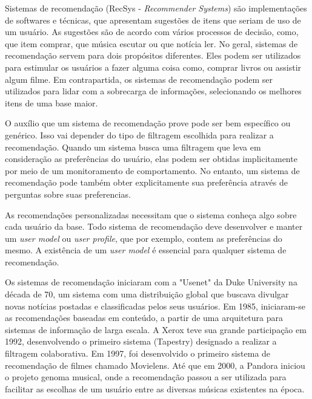 \documentclass{article}
\begin{document}
Sistemas de recomendação (RecSys{\color{red} - \textit{Recommender Systems}}) são implementações de softwares e técnicas, que apresentam sugestões de itens que seriam de uso de um usuário. As sugestões são de acordo com vários processos de decisão, como, que item comprar, que música escutar ou que notícia ler. No geral, sistemas de recomendação servem para dois propósitos diferentes. Eles podem ser utilizados para estimular os usuários a fazer alguma coisa como, comprar livros ou assistir algum filme. Em contrapartida, os sistemas de recomendação podem ser utilizados para lidar com a sobrecarga de informações, selecionando os melhores itens de uma base maior. \cite{jannach2010recommender}

O auxílio que um sistema de recomendação prove pode ser bem específico ou genérico. Isso vai depender do tipo de filtragem escolhida para realizar a recomendação. Quando um sistema busca uma filtragem que leva em consideração as preferências do usuário, elas podem ser obtidas implicitamente por meio de um monitoramento de comportamento. {\color{red} No entanto, um sistema de recomendação pode também obter explicitamente sua preferência através de perguntas sobre suas preferencias.}
\cite{jannach2010recommender}

As recomendações personalizadas necessitam que o sistema conheça algo sobre cada usuário da base.
Todo sistema de recomendação deve desenvolver e manter um \textit{user model} ou \textit{user profile}, que por exemplo, contem as preferências do mesmo.
A existência de um \textit{user model} é essencial para qualquer sistema de recomendação. \cite{jannach2010recommender}

Os sistemas de recomendação iniciaram com a "Usenet" da Duke University na década de 70, um sistema com uma distribuição global que buscava divulgar novas notícias postadas e classificadas pelos seus usuários. Em 1985, iniciaram-se as recomendações baseadas em conteúdo, a partir de uma arquitetura para sistemas de informação de larga escala. A Xerox teve sua grande participação em 1992, desenvolvendo o primeiro sistema (Tapestry) designado a realizar a filtragem colaborativa. Em 1997, foi desenvolvido o primeiro sistema de recomendação de filmes chamado Movielens. Até que em 2000, a Pandora iniciou o projeto genoma musical, onde a recomendação passou a ser utilizada para facilitar as escolhas de um usuário entre as diversas músicas existentes na época. \cite{bhatnagar2016collaborative}

\end{document}
